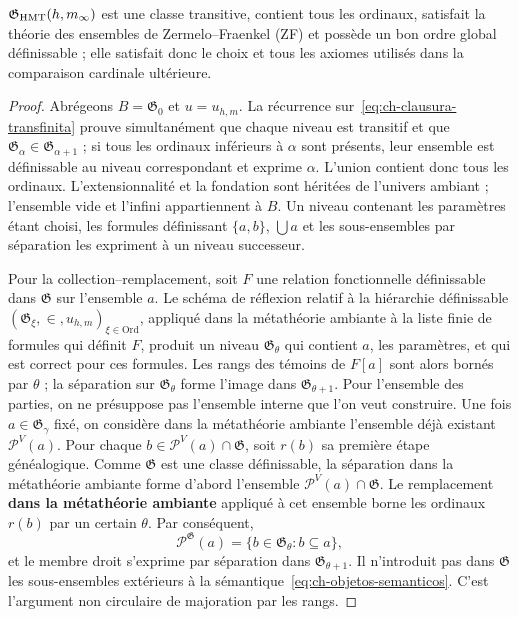 \begin{lemma}
\label{thm:ch-6b}
\(\mathfrak G_{\rm HMT}(h,m_\infty)\) est une classe transitive, contient tous les ordinaux, satisfait la théorie des ensembles de Zermelo--Fraenkel (ZF) et possède un bon ordre global définissable ; elle satisfait donc le choix et tous les axiomes utilisés dans la comparaison cardinale ultérieure.

\end{lemma}
\begin{proof}
Abrégeons \(B=\mathfrak G_0\) et \(u=u_{h,m}\). La récurrence sur~\eqref{eq:ch-clausura-transfinita} prouve simultanément que chaque niveau est transitif et que \(\mathfrak G_\alpha\in\mathfrak G_{\alpha+1}\) ; si tous les ordinaux inférieurs à \(\alpha\) sont présents, leur ensemble est définissable au niveau correspondant et exprime \(\alpha\). L'union contient donc tous les ordinaux. L'extensionnalité et la fondation sont héritées de l'univers ambiant ; l'ensemble vide et l'infini appartiennent à \(B\). Un niveau contenant les paramètres étant choisi, les formules définissant \(\{a,b\}\), \(\bigcup a\) et les sous-ensembles par séparation les expriment à un niveau successeur.

Pour la collection--remplacement, soit \(F\) une relation fonctionnelle définissable dans \(\mathfrak G\) sur l'ensemble \(a\). Le schéma de réflexion relatif à la hiérarchie définissable \((\mathfrak G_\xi,\in,u_{h,m})_{\xi\in\mathrm{Ord}}\), appliqué dans la métathéorie ambiante à la liste finie de formules qui définit \(F\), produit un niveau \(\mathfrak G_\theta\) qui contient \(a\), les paramètres, et qui est correct pour ces formules. Les rangs des témoins de \(F[a]\) sont alors bornés par \(\theta\) ; la séparation sur \(\mathfrak G_\theta\) forme l'image dans \(\mathfrak G_{\theta+1}\). Pour l'ensemble des parties, on ne présuppose pas l'ensemble interne que l'on veut construire. Une fois \(a\in\mathfrak G_\gamma\) fixé, on considère dans la métathéorie ambiante l'ensemble déjà existant \(\mathcal P^V(a)\). Pour chaque \(b\in\mathcal P^V(a)\cap\mathfrak G\), soit \(r(b)\) sa première étape généalogique. Comme \(\mathfrak G\) est une classe définissable, la séparation dans la métathéorie ambiante forme d'abord l'ensemble \(\mathcal P^V(a)\cap\mathfrak G\). Le remplacement \textbf{dans la métathéorie ambiante} appliqué à cet ensemble borne les ordinaux \(r(b)\) par un certain \(\theta\). Par conséquent,
\[
 \mathcal P^{\mathfrak G}(a)
 =\{b\in\mathfrak G_\theta:b\subseteq a\},
\]
et le membre droit s'exprime par séparation dans \(\mathfrak G_{\theta+1}\). Il n'introduit pas dans \(\mathfrak G\) les sous-ensembles extérieurs à la sémantique~\eqref{eq:ch-objetos-semanticos}. C'est l'argument non circulaire de majoration par les rangs.


\end{proof}

